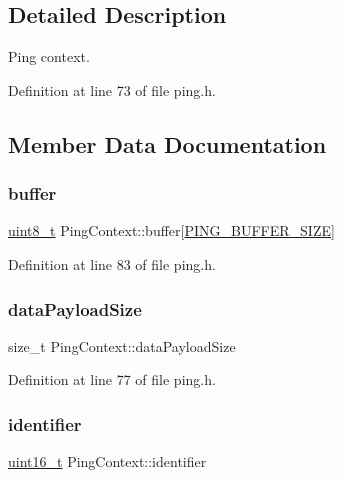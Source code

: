 \subsection{Detailed Description}
Ping context. 

Definition at line 73 of file ping.\+h.



\subsection{Member Data Documentation}
\mbox{\label{structPingContext_aed5669c080545d5f0ef2d655d08bf685}} 
\subsubsection{\texorpdfstring{buffer}{buffer}}
{\footnotesize\ttfamily \hyperlink{stdint_8h_aba7bc1797add20fe3efdf37ced1182c5}{uint8\+\_\+t} Ping\+Context\+::buffer\mbox{[}\hyperlink{ping_8h_a01bcde96ad86fbab0faceac74cfb9c19}{P\+I\+N\+G\+\_\+\+B\+U\+F\+F\+E\+R\+\_\+\+S\+I\+ZE}\mbox{]}}



Definition at line 83 of file ping.\+h.

\mbox{\label{structPingContext_ae06fb21c6e63db031f631068a10d546f}} 
\subsubsection{\texorpdfstring{data\+Payload\+Size}{dataPayloadSize}}
{\footnotesize\ttfamily size\+\_\+t Ping\+Context\+::data\+Payload\+Size}



Definition at line 77 of file ping.\+h.

\mbox{\label{structPingContext_a589a580b784d48c631cc623957872fbd}} 
\subsubsection{\texorpdfstring{identifier}{identifier}}
{\footnotesize\ttfamily \hyperlink{stdint_8h_a273cf69d639a59973b6019625df33e30}{uint16\+\_\+t} Ping\+Context\+::identifier}



